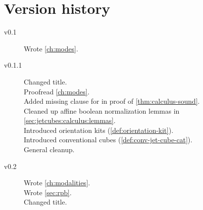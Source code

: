 \documentclass[a4paper]{memoir}
\begin{document}
\chapter{Version history}
\begin{description}
	\item[v0.1] Wrote \cref{ch:modes}.
	\item[v0.1.1] Changed title. \\
		Proofread \cref{ch:modes}. \\
		Added missing clause for  in proof of \cref{thm:calculus-sound}. \\
		Cleaned up affine boolean normalization lemmas in \cref{sec:jetcubes:calculus:lemmas}. \\
		Introduced orientation kits (\cref{def:orientation-kit}). \\
		Introduced conventional cubes (\cref{def:conv-jet-cube-cat}). \\
		General cleanup.
	\item[v0.2] Wrote \cref{ch:modalities}. \\
		Wrote \cref{sec:rpb}. \\
		Changed title.
\end{description}



\end{document}
